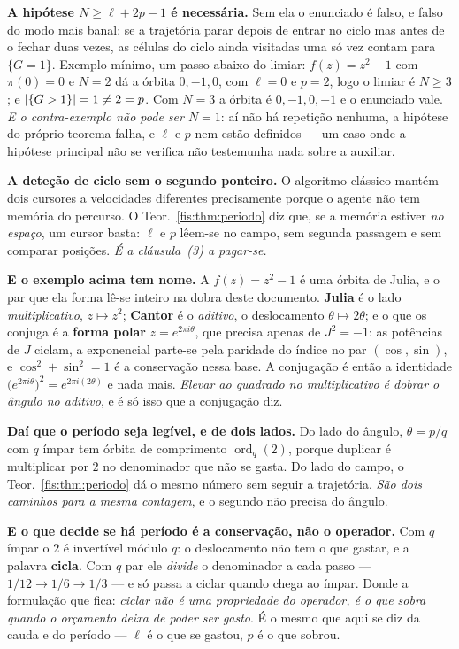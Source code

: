 \documentclass[livro.tex]{subfiles}
\begin{document}
\medskip\noindent\textbf{A hipótese $N\ge\ell+2p-1$ é necessária.} Sem ela o
enunciado é falso, e falso do modo mais banal: se a trajetória parar depois de
entrar no ciclo mas antes de o fechar duas vezes, as células do ciclo ainda
visitadas uma só vez contam para $\{G=1\}$. Exemplo mínimo, um passo abaixo do
limiar: $f(z)=z^2-1$ com $\pi(0)=0$ e $N=2$ dá a órbita $0,-1,0$, com $\ell=0$ e
$p=2$, logo o limiar é $N\ge3$; e $\lvert \{G>1\}\rvert=1\neq2=p$. Com $N=3$ a órbita é
$0,-1,0,-1$ e o enunciado vale. \emph{E o contra-exemplo não pode ser $N=1$}: aí
não há repetição nenhuma, a hipótese do próprio teorema falha, e $\ell$ e $p$ nem
estão definidos --- um caso onde a hipótese principal não se verifica não
testemunha nada sobre a auxiliar.

\medskip\noindent\textbf{A deteção de ciclo sem o segundo ponteiro.} O algoritmo
clássico mantém dois cursores a velocidades diferentes precisamente porque o
agente não tem memória do percurso. O Teor.~\ref{fis:thm:periodo} diz que, se a
memória estiver \emph{no espaço}, um cursor basta: $\ell$ e $p$ lêem-se no campo,
sem segunda passagem e sem comparar posições. \emph{É a cláusula~(3) a
pagar-se.}

\medskip\noindent\textbf{E o exemplo acima tem nome.} A $f(z)=z^{2}-1$ é uma
órbita de Julia, e o par que ela forma lê-se inteiro na dobra deste documento.
\textbf{Julia} é o lado \emph{multiplicativo}, $z\mapsto z^{2}$; \textbf{Cantor} é
o \emph{aditivo}, o deslocamento $\theta\mapsto2\theta$; e o que os conjuga é a
\textbf{forma polar} $z=e^{2\pi i\theta}$, que precisa apenas de $J^{2}=-1$: as
potências de $J$ ciclam, a exponencial parte-se pela paridade do índice no par
$(\cos,\sin)$, e $\cos^{2}+\sin^{2}=1$ é a conservação nessa base. A
conjugação é então a identidade $\bigl(e^{2\pi i\theta}\bigr)^{2}=e^{2\pi
i(2\theta)}$ e nada mais. \emph{Elevar ao quadrado no multiplicativo é dobrar o
ângulo no aditivo}, e é só isso que a conjugação diz.

\medskip\noindent\textbf{Daí que o período seja legível, e de dois lados.} Do
lado do ângulo, $\theta=p/q$ com $q$ ímpar tem órbita de comprimento
$\operatorname{ord}_q(2)$, porque duplicar é multiplicar por $2$ no denominador
que não se gasta. Do lado do campo, o Teor.~\ref{fis:thm:periodo} dá o mesmo
número sem seguir a trajetória. \emph{São dois caminhos para a mesma contagem}, e
o segundo não precisa do ângulo.

\medskip\noindent\textbf{E o que decide se há período é a conservação, não o
operador.} Com $q$ ímpar o $2$ é invertível módulo $q$: o deslocamento não tem o
que gastar, e a palavra \textbf{cicla}. Com $q$ par ele \emph{divide} o
denominador a cada passo --- $1/12\to1/6\to1/3$ --- e só passa a ciclar quando
chega ao ímpar. Donde a formulação que fica: \emph{ciclar não é uma propriedade
do operador, é o que sobra quando o orçamento deixa de poder ser gasto}. É o
mesmo que aqui se diz da cauda e do período --- $\ell$ é o que se gastou, $p$ é o
que sobrou.
\end{document}
